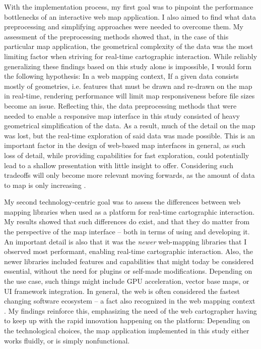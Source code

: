 With the implementation process, my first goal was to pinpoint
the performance bottlenecks of
an interactive web map application.
I also aimed to find what data preprocessing and simplifying approaches
were needed to overcome them.
My assessment of the preprocessing methods showed that, in the case of this particular
map application, the geometrical complexity of the data was the most limiting factor
when striving for real-time cartographic interaction.
While reliably generalizing these findings based on this study alone is impossible,
I would form the following hypothesis:
In a web mapping context, If a given data consists mostly of geometries, i.e.
features that must be drawn and re-drawn on the map in real-time,
rendering performance will limit map responsiveness before file sizes become an issue.
Reflecting this,
the data preprocessing methods that were needed
to enable a responsive map interface in this study
consisted of heavy geometrical simplification of the data.
As a result, much of the detail on the map was lost,
but the real-time exploration of said data was made possible.
This is an important factor in the design of
web-based map interfaces in general,
as such loss of detail, while providing capabilities for fast exploration,
could potentially lead to
a shallow presentation with little insight to offer.
Considering such tradeoffs will only become more relevant moving forwards,
as the amount of data to map is only increasing \parencite{kra2017}.

My second technology-centric goal was to assess
the differences between web mapping libraries
when used as a platform for real-time cartographic interaction.
My results showed that such differences do exist,
and that they do matter from the perspective of the map interface --
both in terms of using and developing it.
An important detail is also that
it was the \textit{newer} web-mapping libraries that I observed most performant,
enabling real-time cartographic interaction.
Also, the newer libraries included features and capabilities
that might today be considered essential,
without the need for plugins or self-made modifications.
Depending on the use case, such things might include GPU acceleration,
vector base maps, or UI framework integration.
In general, the web is often considered the fastest changing
software ecosystem \parencite{mik2019, tai2017} --
a fact also recognized in the web mapping context
\parencite{rot2014, vee2017}.
My findings reinforce this, emphasizing the need of the web cartographer
having to keep up with the rapid innovation happening on the platform:
Depending on the technological choices, the map application implemented in this study
either works fluidly, or is simply nonfunctional.

